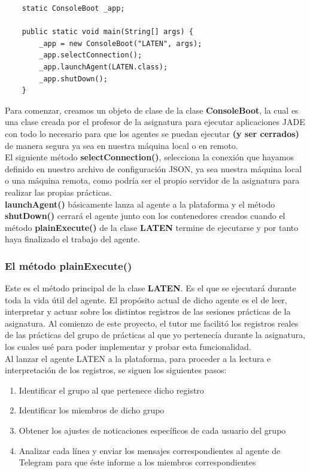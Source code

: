 \begin{lstlisting}
    static ConsoleBoot _app;

    public static void main(String[] args) {
        _app = new ConsoleBoot("LATEN", args);
        _app.selectConnection();
        _app.launchAgent(LATEN.class);
        _app.shutDown();
    }
\end{lstlisting}

Para comenzar, creamos un objeto de clase de la clase \textbf{ConsoleBoot}, la cual es una clase creada por el profesor de la asignatura para ejecutar aplicaciones JADE con todo lo necesario para que los agentes se puedan ejecutar \textbf{(y ser cerrados)} de manera segura ya sea en nuestra máquina local o en remoto.\\

El siguiente método \textbf{selectConnection()}, selecciona la conexión que hayamos definido en nuestro archivo de configuración JSON, ya sea nuestra máquina local o una máquina remota, como podría ser el propio servidor de la asignatura para realizar las propias prácticas.\\

\textbf{launchAgent()} básicamente lanza al agente a la plataforma y el método \textbf{shutDown()} cerrará el agente junto con los contenedores creados cuando el método \textbf{plainExecute()} de la clase \textbf{LATEN} termine de ejecutarse y por tanto haya finalizado el trabajo del agente.

\subsubsection{El método plainExecute()}

Este es el método principal de la clase \textbf{LATEN}. Es el que se ejecutará durante toda la vida útil del agente. El propósito actual de dicho agente es el de leer, interpretar y actuar sobre los distintos registros de las sesiones prácticas de la asignatura. Al comienzo de este proyecto, el tutor me facilitó los registros reales de las prácticas del grupo de prácticas al que yo pertenecía durante la asignatura, los cuales usé para poder implementar y probar esta funcionalidad.\\

Al lanzar el agente LATEN a la plataforma, para proceder a la lectura e interpretación de los registros, se siguen los siguientes pasos:\\

\begin{enumerate}
    \item Identificar el grupo al que pertenece dicho registro
    \item Identificar los miembros de dicho grupo
    \item Obtener los ajustes de noticaciones específicos de cada usuario del grupo
    \item Analizar cada línea y enviar los mensajes correspondientes al agente de Telegram para que éste informe a los miembros correspondientes
\end{enumerate}

